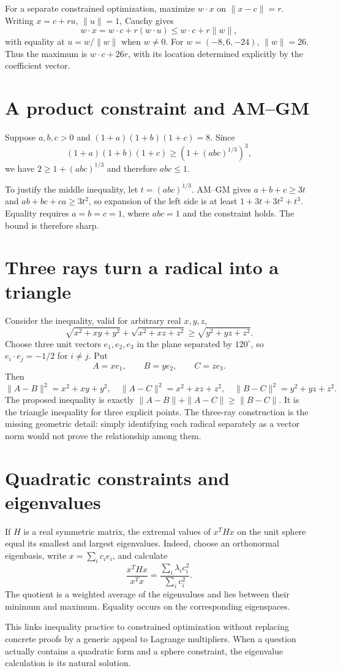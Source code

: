 For a separate constrained optimization, maximize \(w\cdot x\) on \(\|x-c\|=r\). Writing \(x=c+ru\), \(\|u\|=1\), Cauchy gives
\[
 w\cdot x=w\cdot c+r(w\cdot u)
 \le w\cdot c+r\|w\|,
\]
with equality at \(u=w/\|w\|\) when \(w\ne0\). For \(w=(-8,6,-24)\), \(\|w\|=26\). Thus the maximum is \(w\cdot c+26r\), with its location determined explicitly by the coefficient vector.

\section{A product constraint and AM--GM}

Suppose \(a,b,c>0\) and \((1+a)(1+b)(1+c)=8\). Since
\[
 (1+a)(1+b)(1+c)
 \ge\left(1+(abc)^{1/3}\right)^3,
\]
we have \(2\ge1+(abc)^{1/3}\) and therefore \(abc\le1\).

To justify the middle inequality, let \(t=(abc)^{1/3}\). AM--GM gives \(a+b+c\ge3t\) and \(ab+bc+ca\ge3t^2\), so expansion of the left side is at least \(1+3t+3t^2+t^3\). Equality requires \(a=b=c=1\), where \(abc=1\) and the constraint holds. The bound is therefore sharp.

\section{Three rays turn a radical into a triangle}

Consider the inequality, valid for arbitrary real \(x,y,z\),
\[
 \sqrt{x^2+xy+y^2}
 +\sqrt{x^2+xz+z^2}
 \ge\sqrt{y^2+yz+z^2}.
\]
Choose three unit vectors \(e_1,e_2,e_3\) in the plane separated by \(120^\circ\), so \(e_i\cdot e_j=-1/2\) for \(i\ne j\). Put
\[
 A=xe_1,\qquad B=ye_2,\qquad C=ze_3.
\]
Then
\[
 \|A-B\|^2=x^2+xy+y^2,\quad
 \|A-C\|^2=x^2+xz+z^2,\quad
 \|B-C\|^2=y^2+yz+z^2.
\]
The proposed inequality is exactly \(\|A-B\|+\|A-C\|\ge\|B-C\|\). It is the triangle inequality for three explicit points. The three-ray construction is the missing geometric detail: simply identifying each radical separately as a vector norm would not prove the relationship among them.

\section{Quadratic constraints and eigenvalues}

If \(H\) is a real symmetric matrix, the extremal values of \(x^THx\) on the unit sphere equal its smallest and largest eigenvalues. Indeed, choose an orthonormal eigenbasis, write \(x=\sum_i c_ie_i\), and calculate
\[
 \frac{x^THx}{x^Tx}
 =\frac{\sum_i\lambda_i c_i^2}{\sum_i c_i^2}.
\]
The quotient is a weighted average of the eigenvalues and lies between their minimum and maximum. Equality occurs on the corresponding eigenspaces.

This links inequality practice to constrained optimization without replacing concrete proofs by a generic appeal to Lagrange multipliers. When a question actually contains a quadratic form and a sphere constraint, the eigenvalue calculation is its natural solution.
